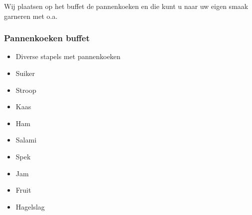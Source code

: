 Wij plaatsen op het buffet de pannenkoeken en die kunt u
naar uw eigen smaak garneren met o.a.

\subsubsection{Pannenkoeken buffet}
\begin{itemize}
	\item Diverse stapels met pannenkoeken
	\item	Suiker
	\item	Stroop
	\item	Kaas
	\item	Ham
	\item	Salami
	\item	Spek
	\item	Jam
	\item	Fruit
	\item	Hagelslag
\end{itemize}